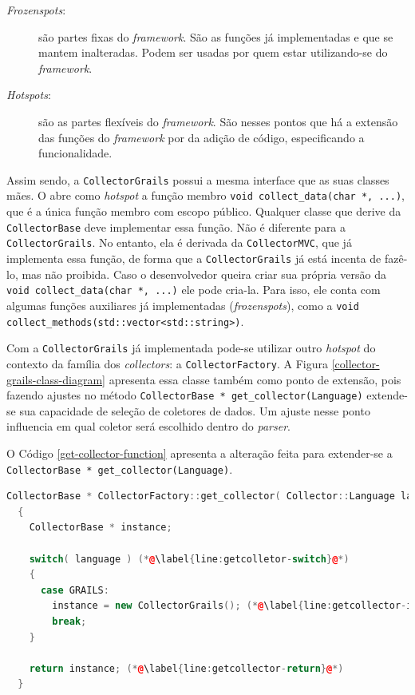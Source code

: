 \begin{description}
\item[\textit{Frozenspots}:] são partes fixas do \textit{framework}. São as funções já
implementadas e que se mantem inalteradas. Podem ser usadas por quem estar
utilizando-se do \textit{framework}.
\item[	\textit{Hotspots}:] são as partes flexíveis do \textit{framework}. São nesses
pontos que há a extensão das funções do \textit{framework} por da adição de
código, especificando a funcionalidade.
\end{description}

Assim sendo, a \lstinline|CollectorGrails| possui a mesma interface que as
suas classes mães. O \framework abre como \textit{hotspot} a função
membro \lstinline|void collect_data(char *, ...)|, que é a única função membro
com escopo público. Qualquer classe que derive da \lstinline|CollectorBase| deve
implementar essa função. Não é diferente para a \lstinline|CollectorGrails|. No
entanto, ela é derivada da \lstinline|CollectorMVC|, que já implementa essa
função, de forma que a \lstinline|CollectorGrails| já está incenta de fazê-lo, mas
não proibida. Caso o desenvolvedor queira criar sua própria versão da
\lstinline|void collect_data(char *, ...)| ele pode cria-la. Para isso, ele conta
com algumas funções auxiliares já implementadas (\textit{frozenspots}), como a
\lstinline|void collect_methods(std::vector<std::string>)|.

Com a \lstinline|CollectorGrails| já implementada pode-se utilizar outro
\textit{hotspot} do contexto da família dos \textit{collectors}: a
\lstinline|CollectorFactory|. A Figura \ref{collector-grails-class-diagram}
apresenta essa classe também como ponto de extensão, pois fazendo ajustes no
método \lstinline|CollectorBase * get_collector(Language)| extende-se sua
capacidade de seleção de coletores de dados. Um ajuste nesse ponto influencia
em qual coletor será escolhido dentro do \textit{parser}.

O Código \ref{get-collector-function} apresenta a alteração feita para extender-se
a \lstinline|CollectorBase * get_collector(Language)|.

\begin{lstlisting}[language=C++, label=get-collector-function, caption=Implementação e extensão da \lstinline{get_collector(Language)}]
CollectorBase * CollectorFactory::get_collector( Collector::Language language ) (*@\label{line:getcolletor-language}@*)
  {
    CollectorBase * instance;

    switch( language ) (*@\label{line:getcolletor-switch}@*)
    {
      case GRAILS:
        instance = new CollectorGrails(); (*@\label{line:getcollector-instancegrails}@*)
        break;
    }

    return instance; (*@\label{line:getcollector-return}@*)
  }
\end{lstlisting}

